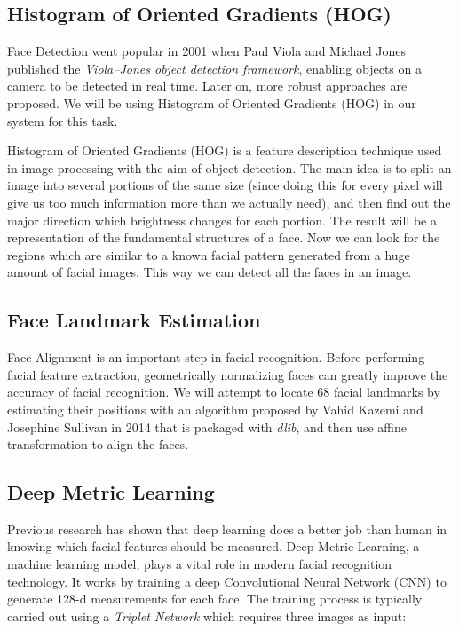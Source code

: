 \subsection{Histogram of Oriented Gradients (HOG)}
Face Detection went popular in 2001 when Paul Viola and Michael Jones published the \emph{Viola–Jones object detection framework},
enabling objects on a camera to be detected in real time. Later on, more robust approaches are proposed. We will be using
Histogram of Oriented Gradients (HOG) in our system for this task.
\vspace{0.3cm}

Histogram of Oriented Gradients (HOG) is a feature description technique used in image processing with the aim of object
detection. The main idea is to split an image into several portions of the same size (since doing this for every pixel will give
us too much information more than we actually need), and then find out the major direction which brightness changes for each portion.
The result will be a representation of the fundamental structures of a face. Now we can look for the regions which are
similar to a known facial pattern generated from a huge amount of facial images. This way we can detect all the faces
in an image.


\subsection{Face Landmark Estimation}
Face Alignment is an important step in facial recognition. Before performing facial feature extraction, geometrically
normalizing faces can greatly improve the accuracy of facial recognition. We will attempt to locate 68 facial landmarks
by estimating their positions with an algorithm proposed by Vahid Kazemi and Josephine Sullivan in 2014 that is packaged
with \emph{dlib}, and then use affine transformation to align the faces.


\subsection{Deep Metric Learning}
Previous research has shown that deep learning does a better job than human in knowing which facial features should
be measured. Deep Metric Learning, a machine learning model, plays a vital role in modern facial recognition technology.
It works by training a deep Convolutional Neural Network (CNN) to generate 128-d measurements for each face. The training
process is typically carried out using a \emph{Triplet Network} which requires three images as input:
\vspace{0.3cm}

